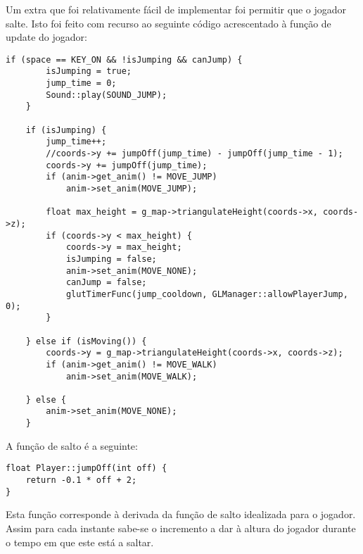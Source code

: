 Um extra que foi relativamente fácil de implementar foi permitir que o jogador salte.
Isto foi feito com recurso ao seguinte código acrescentado à função de update do jogador:

\begin{lstlisting}
if (space == KEY_ON && !isJumping && canJump) {
		isJumping = true;
		jump_time = 0;
		Sound::play(SOUND_JUMP);
	}

	if (isJumping) {
		jump_time++;
		//coords->y += jumpOff(jump_time) - jumpOff(jump_time - 1);
		coords->y += jumpOff(jump_time);
		if (anim->get_anim() != MOVE_JUMP)
			anim->set_anim(MOVE_JUMP);

		float max_height = g_map->triangulateHeight(coords->x, coords->z);
		if (coords->y < max_height) {
			coords->y = max_height;
			isJumping = false;
			anim->set_anim(MOVE_NONE);
			canJump = false;
			glutTimerFunc(jump_cooldown, GLManager::allowPlayerJump, 0);
		}

	} else if (isMoving()) {
		coords->y = g_map->triangulateHeight(coords->x, coords->z);
		if (anim->get_anim() != MOVE_WALK)
			anim->set_anim(MOVE_WALK);

	} else {
		anim->set_anim(MOVE_NONE);
	}
\end{lstlisting}

A função de salto é a seguinte:

\begin{lstlisting}
float Player::jumpOff(int off) {
	return -0.1 * off + 2;
}
\end{lstlisting}

Esta função corresponde à derivada da função de salto idealizada para o jogador. Assim para cada instante sabe-se o incremento a dar à altura do jogador durante o tempo em que este está a saltar.
